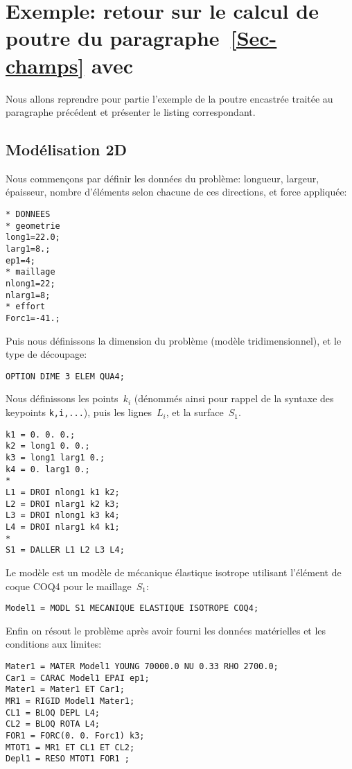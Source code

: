 \section{Exemple: retour sur le calcul de poutre du paragraphe~\ref{Sec-champs} avec \castem}
Nous allons reprendre pour partie l'exemple de la poutre encastrée traitée au paragraphe précédent et présenter le listing \castem correspondant.

\medskip
\subsection{Modélisation 2D}

Nous commençons par définir les données du problème: longueur, largeur, épaisseur, nombre d'éléments selon chacune de ces directions, et force appliquée:
\lstset{language=castem}
\begin{lstlisting}[firstnumber=1]
* DONNEES
* geometrie
long1=22.0;
larg1=8.;
ep1=4;
* maillage
nlong1=22;
nlarg1=8;
* effort
Forc1=-41.;
\end{lstlisting}

Puis nous définissons la dimension du problème (modèle tridimensionnel), et le type de découpage:
\begin{lstlisting}[firstnumber=last]
OPTION DIME 3 ELEM QUA4;
\end{lstlisting}

Nous définissons les points~$k_i$ (dénommés ainsi pour rappel de la syntaxe \ansys des keypoints \verb|k,i,...|), puis les lignes~$L_i$, et la surface~$S_1$.
\begin{lstlisting}[firstnumber=last]
k1 = 0. 0. 0.;
k2 = long1 0. 0.;
k3 = long1 larg1 0.;
k4 = 0. larg1 0.;
*
L1 = DROI nlong1 k1 k2;
L2 = DROI nlarg1 k2 k3;
L3 = DROI nlong1 k3 k4;
L4 = DROI nlarg1 k4 k1;
*
S1 = DALLER L1 L2 L3 L4;
\end{lstlisting}

Le modèle est un modèle de mécanique élastique isotrope utilisant l'élément de coque COQ4 pour le maillage~$S_1$:
\begin{lstlisting}[firstnumber=last]
Model1 = MODL S1 MECANIQUE ELASTIQUE ISOTROPE COQ4;
\end{lstlisting}

Enfin on résout le problème après avoir fourni les données matérielles et les conditions aux limites:
\begin{lstlisting}[firstnumber=last]
Mater1 = MATER Model1 YOUNG 70000.0 NU 0.33 RHO 2700.0;
Car1 = CARAC Model1 EPAI ep1;
Mater1 = Mater1 ET Car1;
MR1 = RIGID Model1 Mater1;
CL1 = BLOQ DEPL L4;
CL2 = BLOQ ROTA L4;
FOR1 = FORC(0. 0. Forc1) k3;
MTOT1 = MR1 ET CL1 ET CL2;
Depl1 = RESO MTOT1 FOR1 ;
\end{lstlisting}

